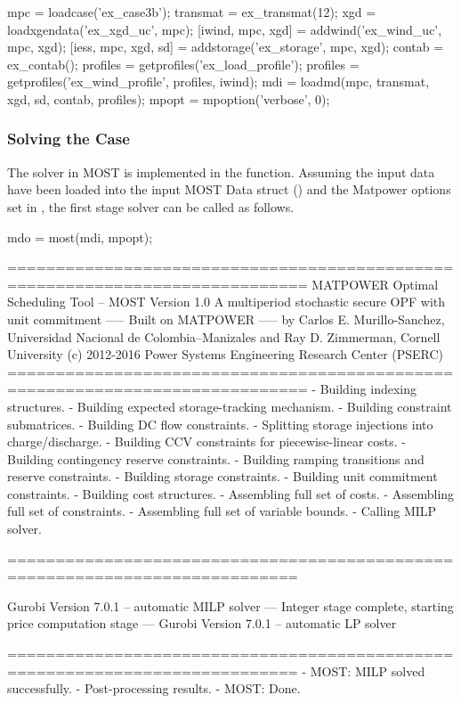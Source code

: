 \documentclass[12pt]{article}
\newcommand{\matpower}[0]{{\sc Matpower}}
\newcommand{\most}[0]{{MOST}}
\newcommand{\md}[0]{{\most{} Data struct}}
\newcommand{\code}[1]{{\relsize{-0.5}{\tt{{#1}}}}}  %
\numberwithin{equation}{section}
\numberwithin{table}{section}
\numberwithin{figure}{section}
\begin{document}
\begin{Code}
mpc = loadcase('ex_case3b');
transmat = ex_transmat(12);
xgd = loadxgendata('ex_xgd_uc', mpc);
[iwind, mpc, xgd] = addwind('ex_wind_uc', mpc, xgd);
[iess, mpc, xgd, sd] = addstorage('ex_storage', mpc, xgd);
contab = ex_contab();
profiles = getprofiles('ex_load_profile');
profiles = getprofiles('ex_wind_profile', profiles, iwind);
mdi = loadmd(mpc, transmat, xgd, sd, contab, profiles);
mpopt = mpoption('verbose', 0);
\end{Code}

\subsubsection{Solving the Case}

The solver in \most{} is implemented in the \code{most} function. Assuming the input data have been loaded into the input \md{} (\code{mdi}) and the \matpower{} options set in \code{mpopt}, the first stage solver can be called as follows.
\begin{Code}
mdo = most(mdi, mpopt);
\end{Code}

\begin{Code}
=============================================================================
          MATPOWER Optimal Scheduling Tool  --  MOST Version 1.0
          A multiperiod stochastic secure OPF with unit commitment
                       -----  Built on MATPOWER  -----
  by Carlos E. Murillo-Sanchez, Universidad Nacional de Colombia--Manizales
                  and Ray D. Zimmerman, Cornell University
       (c) 2012-2016 Power Systems Engineering Research Center (PSERC)       
=============================================================================
- Building indexing structures.
- Building expected storage-tracking mechanism.
- Building constraint submatrices.
  - Building DC flow constraints.
  - Splitting storage injections into charge/discharge.
  - Building CCV constraints for piecewise-linear costs.
  - Building contingency reserve constraints.
  - Building ramping transitions and reserve constraints.
  - Building storage constraints.
  - Building unit commitment constraints.
- Building cost structures.
- Assembling full set of costs.
- Assembling full set of constraints.
- Assembling full set of variable bounds.
- Calling MILP solver.

============================================================================

Gurobi Version 7.0.1 -- automatic MILP solver
--- Integer stage complete, starting price computation stage ---
Gurobi Version 7.0.1 -- automatic LP solver

============================================================================
- MOST: MILP solved successfully.
- Post-processing results.
- MOST: Done.
\end{Code}
\end{document}
